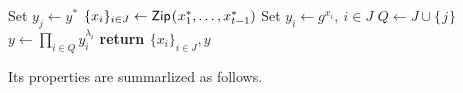 \documentclass[10pt, psamsfonts, reqno]{amsart}
\theoremstyle{definition}
\theoremstyle{remark}
\numberwithin{equation}{section}
\begin{document}
\begin{minipage}{0.96\textwidth}
\begin{algorithm}[H]
    \centering
    \caption{$\mathcal{D}\hspace{1pt}(
	\hspace{1pt}y^*,
	x_1^*, \dots, x_{t-1}^*
	\hspace{1pt};
	j\hspace{1pt},
	J
)$}\label{alg_shamir_simulation}
    \begin{algorithmic}[1]
    	\vspace{4pt}
    	\State
    		Set $y_j \leftarrow y^*$\vspace{6pt}
    	\State
    		$\{x_i\}_{i \in J} \leftarrow
    		\mathsf{Zip}\hspace{0.75pt}
    		(\hspace{0.5pt}x_1^*, \dots, x_{t-1}^*)$\vspace{6pt}
		\State
    		Set $y_i \leftarrow g ^ {x_i},\ i \in J$\vspace{6pt}
    	\State
    		$Q \leftarrow J \cup \{\hspace{1pt}j\hspace{1pt}\}$\vspace{6pt}
    	\State
    		$y \leftarrow \prod_{i \in Q} y_i ^ {\lambda_i}$\vspace{6pt}
		\State
			\textbf{return $\{x_i\}_{i \in J}, y$}\vspace{5pt}
    \end{algorithmic}
\end{algorithm}
\vspace{0pt}
\end{minipage}

\noindent
Its properties are summarlized as follows.
\end{document}
